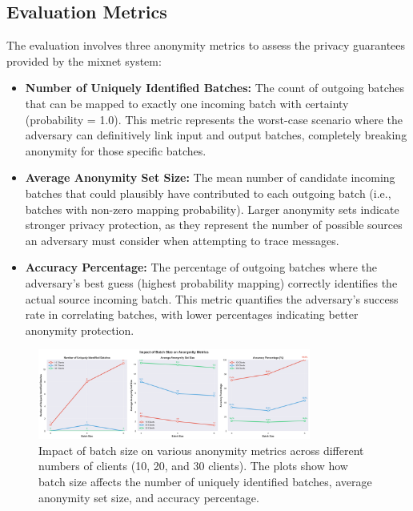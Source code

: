 \documentclass{article}
\begin{document}
\subsection{Evaluation Metrics}
\label{sec:metrics}

The evaluation involves three anonymity metrics 
to assess the privacy guarantees provided by the 
mixnet system:

\begin{itemize}
\item \textbf{Number of Uniquely Identified Batches:} The count of 
outgoing batches that can be mapped to exactly one incoming 
batch with certainty (probability = 1.0). This metric represents 
the worst-case scenario where the adversary can definitively link 
input and output batches, completely breaking anonymity for those 
specific batches.

\item \textbf{Average Anonymity Set Size:} The mean number 
of candidate incoming batches that could plausibly have 
contributed to each outgoing batch (i.e., batches with non-zero 
mapping probability). Larger anonymity sets indicate 
stronger privacy protection, as they represent 
the number of possible sources an adversary must 
consider when attempting to trace messages.

\item \textbf{Accuracy Percentage:} The percentage of 
outgoing batches where the adversary's best guess 
(highest probability mapping) correctly identifies 
the actual source incoming batch. This metric quantifies 
the adversary's success rate in correlating batches, 
with lower percentages indicating better anonymity protection.
\end{itemize}


\begin{figure}[!htb]
\centering
\includegraphics[width=0.8\textwidth]{diagrams/batch_size_analysis_combined.png}
\caption{Impact of batch size on various anonymity metrics across 
different numbers of clients (10, 20, and 30 clients). 
The plots show how batch size affects the number of uniquely 
identified batches, average anonymity set size, and accuracy percentage.}
\label{fig:batchsize_analysis}
\end{figure}
\end{document}
